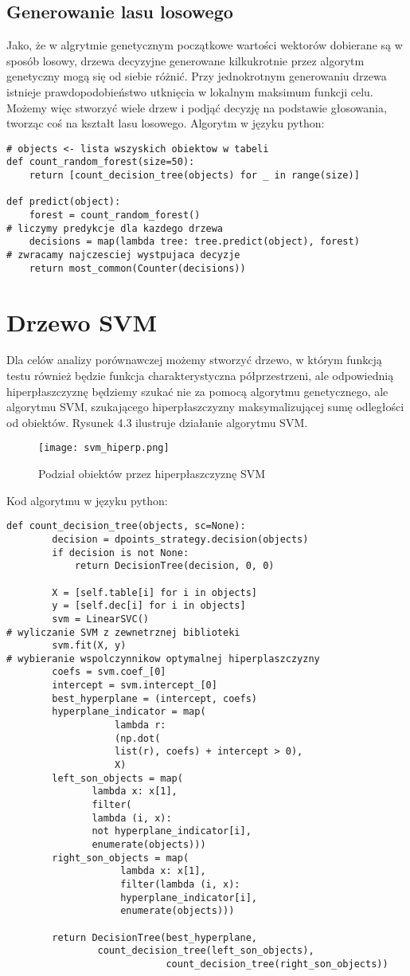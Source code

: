 \documentclass[magisterska]{pracamgr}
\theoremstyle{plain}
\theoremstyle{definition}
\theoremstyle{remark}
\begin{document}
\subsection{Generowanie lasu losowego}
Jako, że w algrytmie genetycznym początkowe wartości wektorów dobierane są w sposób losowy, 
drzewa decyzyjne generowane kilkukrotnie przez algorytm genetyczny mogą się od siebie różnić.
Przy jednokrotnym generowaniu drzewa istnieje prawdopodobieństwo utknięcia w lokalnym maksimum funkcji celu.
Możemy więc stworzyć wiele drzew i podjąć decyzję na podstawie głosowania, tworząc coś na kształt lasu losowego.
Algorytm w języku python:
\begin{lstlisting}
# objects <- lista wszyskich obiektow w tabeli
def count_random_forest(size=50):	
	return [count_decision_tree(objects) for _ in range(size)]
      
def predict(object):
	forest = count_random_forest()
# liczymy predykcje dla kazdego drzewa
	decisions = map(lambda tree: tree.predict(object), forest)
# zwracamy najczesciej wystpujaca decyzje
	return most_common(Counter(decisions))		
\end{lstlisting}

\section{Drzewo SVM}
Dla celów analizy porównawczej możemy stworzyć drzewo, w którym funkcją testu
również będzie funkcja charakterystyczna półprzestrzeni, ale odpowiednią hiperpłaszczyznę
będziemy szukać nie za pomocą algorytmu genetycznego, ale algorytmu SVM, szukającego 
hiperpłaszczyzny maksymalizującej sumę odległości od obiektów. Rysunek 4.3 ilustruje działanie
algorytmu SVM.
\begin{figure}
 \caption{Podział obiektów przez hiperpłaszczyznę SVM}
 \texttt{[image: svm\_hiperp.png]}
\end{figure}
Kod algorytmu w języku python:
\begin{lstlisting}
def count_decision_tree(objects, sc=None):
        decision = dpoints_strategy.decision(objects)
        if decision is not None:
            return DecisionTree(decision, 0, 0)

        X = [self.table[i] for i in objects]
        y = [self.dec[i] for i in objects]
        svm = LinearSVC()
# wyliczanie SVM z zewnetrznej biblioteki
        svm.fit(X, y)
# wybieranie wspolczynnikow optymalnej hiperplaszczyzny
        coefs = svm.coef_[0]
        intercept = svm.intercept_[0]
        best_hyperplane = (intercept, coefs)
        hyperplane_indicator = map(
			       lambda r: 
			       (np.dot(
			       list(r), coefs) + intercept > 0),
			       X)
        left_son_objects = map(
			   lambda x: x[1], 
			   filter(
			   lambda (i, x): 
			   not hyperplane_indicator[i], 
			   enumerate(objects)))
        right_son_objects = map(
		            lambda x: x[1], 
		            filter(lambda (i, x): 
		            hyperplane_indicator[i], 
		            enumerate(objects)))

        return DecisionTree(best_hyperplane, 
			    count_decision_tree(left_son_objects),
                            count_decision_tree(right_son_objects))
\end{lstlisting}
\end{document}
